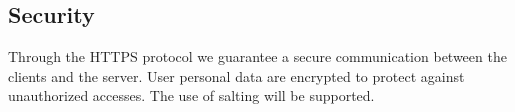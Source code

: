 \subsection{Security}
Through the HTTPS protocol we guarantee a secure communication between the clients and the server.
User personal data are encrypted to protect against unauthorized accesses. The use of salting will be supported.
